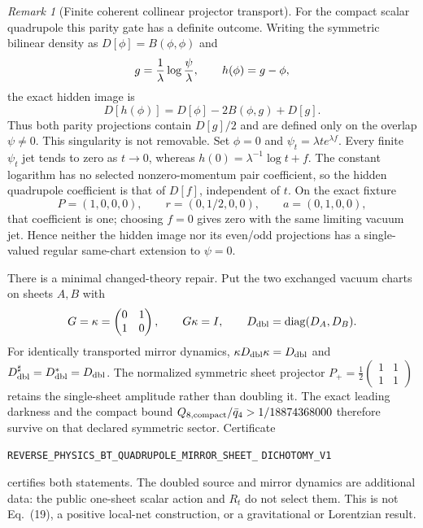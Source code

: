 \documentclass[11pt]{article}
\theoremstyle{definition}
\theoremstyle{remark}
\newtheorem{remark}[theorem]{Remark}
\begin{document}
\begin{remark}[Finite coherent collinear projector transport]
For the compact scalar quadrupole this parity gate has a definite outcome.
Writing the symmetric bilinear density as $D[\phi]=B(\phi,\phi)$ and
\[
 g={1\over\lambda}\log{\psi\over\lambda},\qquad h(\phi)=g-\phi,
\]
the exact hidden image is
\[
 D[h(\phi)]=D[\phi]-2B(\phi,g)+D[g].
\]
Thus both parity projections contain $D[g]/2$ and are defined only on the
overlap $\psi\ne0$.  This singularity is not removable.  Set $\phi=0$ and
$\psi_t=\lambda t e^{\lambda f}$.  Every finite $\psi_t$ jet tends to zero
as $t\to0$, whereas $h(0)=\lambda^{-1}\log t+f$.  The constant logarithm has
no selected nonzero-momentum pair coefficient, so the hidden quadrupole
coefficient is that of $D[f]$, independent of $t$.  On the exact fixture
\[
 P=(1,0,0,0),\qquad r=(0,1/2,0,0),\qquad a=(0,1,0,0),
\]
that coefficient is one; choosing $f=0$ gives zero with the same limiting
vacuum jet.  Hence neither the hidden image nor its even/odd projections has
a single-valued regular same-chart extension to $\psi=0$.

There is a minimal changed-theory repair.  Put the two exchanged vacuum
charts on sheets $A,B$ with
\[
 G=\kappa=\begin{pmatrix}0&1\\1&0\end{pmatrix},\qquad G\kappa=I,
 \qquad D_{\rm dbl}=\operatorname{diag}(D_A,D_B).
\]
For identically transported mirror dynamics,
$\kappa D_{\rm dbl}\kappa=D_{\rm dbl}$ and
$D_{\rm dbl}^{\sharp}=D_{\rm dbl}^{*}=D_{\rm dbl}$.  The normalized
symmetric sheet projector
$P_+=\tfrac12\left(\begin{smallmatrix}1&1\\1&1\end{smallmatrix}\right)$
retains the single-sheet amplitude rather than doubling it.  The exact
leading darkness and the compact bound
$Q_{8,\rm compact}/\bar q_4>1/18874368000$ therefore survive on that declared
symmetric sector.  Certificate
\par\noindent
\texttt{REVERSE\_PHYSICS\_BT\_QUADRUPOLE\_MIRROR\_SHEET\_}
\allowbreak\texttt{DICHOTOMY\_V1}
\par\noindent
certifies both statements.  The doubled source and mirror dynamics are
additional data: the public one-sheet scalar action and $R_t$ do not select
them.  This is not Eq.~(19), a positive local-net construction, or a
gravitational or Lorentzian result.


\end{remark}
\end{document}

